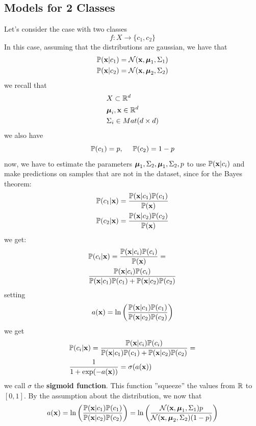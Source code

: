 \documentclass[10pt, letterpaper]{report}
\begin{document}
\subsection{Models for 2 Classes}
Let's consider the case with two classes
$$ 
f:X\rightarrow\{c_1,c_2\}
$$
In this case, assuming that the distributions are gaussian, we have that\begin{align}
    &{\mathbb P}(\mathbf x|c_1)=\mathcal N(\mathbf x,{\boldsymbol{\mu}}_1,\Sigma_1)\\
    &{\mathbb P}(\mathbf x|c_2)=\mathcal N(\mathbf x,{\boldsymbol{\mu}}_2,\Sigma_2)
\end{align}
we recall that\begin{align}
    &X\subset {\mathbb R}^d\\ 
    &{\boldsymbol{\mu}}_i,\mathbf x\in{\mathbb R}^d\\
    &\Sigma_i\in Mat(d\times d)
\end{align}
we also have\begin{equation}
    {\mathbb P}(c_1)=p,  \ \ \ \ {\mathbb P}(c_2)=1-p
\end{equation}
now, we have to estimate the parameters ${\boldsymbol{\mu}}_1,\Sigma_2,{\boldsymbol{\mu}}_1,\Sigma_2,p$ to use ${\mathbb P}(\mathbf x|c_i)$ and make predictions on samples that are not in the dataset, since for the Bayes theorem:\begin{align}
    &{\mathbb P}(c_1|\mathbf x)=\frac{{\mathbb P}(\mathbf x|c_1){\mathbb P}(c_1)}{{\mathbb P}(\mathbf x)}\\
    &{\mathbb P}(c_2|\mathbf x)=\frac{{\mathbb P}(\mathbf x|c_2){\mathbb P}(c_2)}{{\mathbb P}(\mathbf x)}
\end{align}
we get:\begin{align}
    &{\mathbb P}(c_i|\mathbf x)=\frac{{\mathbb P}(\mathbf x|c_i){\mathbb P}(c_i)}{{\mathbb P}(\mathbf x)}=\\
    &\frac{{\mathbb P}(\mathbf x|c_i){\mathbb P}(c_i)}{{\mathbb P}(\mathbf x|c_1){\mathbb P}(c_1)+{\mathbb P}(\mathbf x|c_2){\mathbb P}(c_2)}
\end{align}
setting
\begin{equation}
    a(\mathbf x)=\ln\left(\frac{{\mathbb P}(\mathbf x|c_1){\mathbb P}(c_1)}{{\mathbb P}(\mathbf x|c_2){\mathbb P}(c_2)}\right)
\end{equation}
we get\begin{align}
    &{\mathbb P}(c_i|\mathbf x)=\frac{{\mathbb P}(\mathbf x|c_i){\mathbb P}(c_i)}{{\mathbb P}(\mathbf x|c_1){\mathbb P}(c_1)+{\mathbb P}(\mathbf x|c_2){\mathbb P}(c_2)}=\\
    &\frac{1}{1+\exp(-a(\mathbf x))}=\sigma(a(\mathbf x))
\end{align}
we call  $\sigma$ the \textbf{sigmoid function}. This function ''squeeze'' the values from ${\mathbb R}$ to $[0,1]$. By the assumption about the distribution, we now that\begin{equation}
    a(\mathbf x)=\ln\left(\frac{{\mathbb P}(\mathbf x|c_1){\mathbb P}(c_1)}{{\mathbb P}(\mathbf x|c_2){\mathbb P}(c_2)}\right)=
\ln\left(\frac{\mathcal N(\mathbf x,{\boldsymbol{\mu}}_1,\Sigma_1)p}{\mathcal N(\mathbf x,{\boldsymbol{\mu}}_2,\Sigma_2)(1-p)}\right)
\end{equation}
\end{document}
